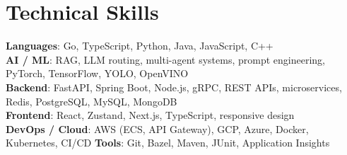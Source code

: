 \documentclass[letterpaper,11pt]{article}
\begin{document}
\section{Technical Skills}
 \begin{itemize}[leftmargin=0.15in, label={}]
    \small{\item{
\textbf{Languages}{: Go, TypeScript, Python, Java, JavaScript, C++} \\
\textbf{AI / ML}{: RAG, LLM routing, multi-agent systems, prompt engineering, PyTorch, TensorFlow, YOLO, OpenVINO} \\
\textbf{Backend}{: FastAPI, Spring Boot, Node.js, gRPC, REST APIs, microservices, Redis, PostgreSQL, MySQL, MongoDB} \\
\textbf{Frontend}{: React, Zustand, Next.js, TypeScript, responsive design} \\
\textbf{DevOps / Cloud}{: AWS (ECS, API Gateway), GCP, Azure, Docker, Kubernetes, CI/CD} \hspace{5pt} \textbf{Tools}{: Git, Bazel, Maven, JUnit, Application Insights}
    }}
 \end{itemize}


\end{document}
